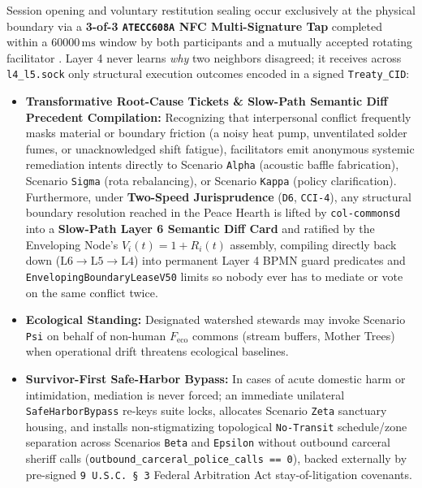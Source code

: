 Session opening and voluntary restitution sealing occur exclusively at the physical boundary via a \textbf{3-of-3 \texttt{ATECC608A} NFC Multi-Signature
Tap} completed within a $60000\,\mathrm{ms}$ window by both participants and a mutually accepted rotating facilitator \parencite{microchip_atecc608a}.
Layer 4 never learns \emph{why} two neighbors disagreed; it receives across \texttt{l4\_l5.sock} only structural execution outcomes encoded in a signed
\texttt{Treaty\_CID}:
\begin{itemize}
    \item \textbf{Transformative Root-Cause Tickets \& Slow-Path Semantic Diff Precedent Compilation:} Recognizing that interpersonal conflict
    frequently masks material or boundary friction (a noisy heat pump, unventilated solder fumes, or unacknowledged shift fatigue), facilitators emit
    anonymous systemic remediation intents directly to Scenario \texttt{Alpha} (acoustic baffle fabrication), Scenario \texttt{Sigma} (rota rebalancing),
    or Scenario \texttt{Kappa} (policy clarification). Furthermore, under \textbf{Two-Speed Jurisprudence} (\texttt{D6}, \texttt{CCI-4}), any structural
    boundary resolution reached in the Peace Hearth is lifted by \texttt{col-commonsd} into a \textbf{Slow-Path Layer 6 Semantic Diff Card} and ratified
    by the Enveloping Node's $V_i(t) = 1 + R_i(t)$ assembly, compiling directly back down ($\mathrm{L6} \to \mathrm{L5} \to \mathrm{L4}$) into permanent
    Layer 4 BPMN guard predicates and \texttt{EnvelopingBoundaryLeaseV50} limits so nobody ever has to mediate or vote on the same conflict twice.
    \item \textbf{Ecological Standing:} Designated watershed stewards may invoke Scenario \texttt{Psi} on behalf of non-human $F_{\mathrm{eco}}$ commons
    (stream buffers, Mother Trees) when operational drift threatens ecological baselines.
    \item \textbf{Survivor-First Safe-Harbor Bypass:} In cases of acute domestic harm or intimidation, mediation is never forced; an immediate
    unilateral \texttt{SafeHarborBypass} re-keys suite locks, allocates Scenario \texttt{Zeta} sanctuary housing, and installs non-stigmatizing
    topological \texttt{No-Transit} schedule/zone separation across Scenarios \texttt{Beta} and \texttt{Epsilon} without outbound carceral sheriff calls
    (\texttt{outbound\_carceral\_police\_calls == 0}), backed externally by pre-signed \texttt{9 U.S.C.\ \S~3} Federal Arbitration Act
    stay-of-litigation covenants.
\end{itemize}


